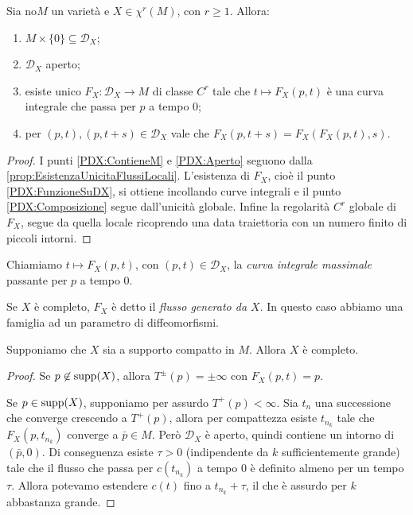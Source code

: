 \begin{proposition} \label{prop:ProprietaDX}
	Sia no$M$ un varietà e $X\in \chi^r(M)$, con $r\ge 1$. Allora:
	\begin{enumerate}
	 \item $M\times\{0\}\subseteq \mathcal D_X$; \label{PDX:ContieneM}
	 \item $\mathcal D_X$ aperto; \label{PDX:Aperto}
	 \item esiste unico $F_X:\mathcal D_X\to M$ di classe $C^r$ tale che $t\mapsto F_X(p,t)$ è una curva integrale che passa per $p$ a tempo 0; \label{PDX:FunzioneSuDX}
	 \item per $(p,t),(p,t+s)\in\mathcal D_X$ vale che $F_X(p,t+s)=F_X(F_X(p,t),s)$. \label{PDX:Composizione}
	\end{enumerate}
\end{proposition}

\begin{proof}
	I punti \ref{PDX:ContieneM} e \ref{PDX:Aperto} seguono dalla \cref{prop:EsistenzaUnicitaFlussiLocali}. L'esistenza di $F_X$, cioè il punto \ref{PDX:FunzioneSuDX}, si ottiene incollando curve integrali e il punto \ref{PDX:Composizione} segue dall'unicità globale.
	Infine la regolarità $C^r$ globale di $F_X$, segue da quella locale ricoprendo una data traiettoria con un numero finito di piccoli intorni.
\end{proof}

\begin{definition}  
	Chiamiamo $t\mapsto F_X(p,t)$, con $(p,t)\in\mathcal D_X$, la \emph{curva integrale massimale} passante per $p$ a tempo 0.
	
	Se $X$ è completo, $F_X$ è detto il \emph{flusso generato da $X$}. In questo caso abbiamo una famiglia ad un parametro di diffeomorfismi.
\end{definition}

\begin{proposition}
	Supponiamo che $X$ sia a supporto compatto in $M$. Allora $X$ è completo.
\end{proposition}

\begin{proof}
	Se $p\not \in\operatorname{supp} (X)$, allora $T^{\pm}(p)=\pm\infty$ con $F_X(p,t)=p$.
	
	Se $p\in\operatorname{supp}(X)$, supponiamo per assurdo $T^+(p)<\infty$. Sia $t_n$ una successione che converge crescendo a $T^+(p)$, allora per compattezza esiste $t_{n_k}$ tale che $F_X(p,t_{n_k})$ converge a $\bar p\in M$.
	Però $\mathcal D_X$ è aperto, quindi contiene un intorno di $(\bar p,0)$.
	Di conseguenza esiste $\tau >0$ (indipendente da $k$ sufficientemente grande) tale che il flusso che passa per $c(t_{n_k})$ a tempo 0 è definito almeno per un tempo $\tau$.
	Allora potevamo estendere $c(t)$ fino a $t_{n_k}+\tau$, il che è assurdo per $k$ abbastanza grande.
\end{proof}



